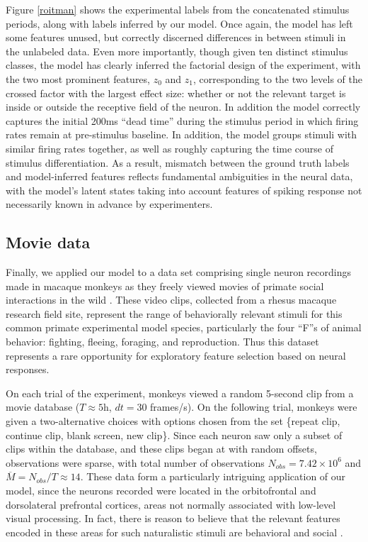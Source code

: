 \documentclass{article} %
\begin{document}
Figure \ref{roitman} shows the experimental labels from the concatenated stimulus periods, along with labels inferred by our model. Once again, the model has left some features unused, but correctly discerned differences in between stimuli in the unlabeled data. Even more importantly, though given ten distinct stimulus classes, the model has clearly inferred the factorial design of the experiment, with the two most prominent features, $z_0$ and $z_1$, corresponding to the two levels of the crossed factor with the largest effect size: whether or not the relevant target is inside or outside the receptive field of the neuron. In addition the model correctly captures the initial 200ms ``dead time'' during the stimulus period in which firing rates remain at pre-stimulus baseline. In addition, the model groups stimuli with similar firing rates together, as well as roughly capturing the time course of stimulus differentiation. As a result, mismatch between the ground truth labels and model-inferred features reflects fundamental ambiguities in the neural data, with the model's latent states taking into account features of spiking response not necessarily known in advance by experimenters.

\subsection{Movie data}
Finally, we applied our model to a data set comprising single neuron recordings made in macaque monkeys as they freely viewed movies of primate social interactions in the wild %
 . These video clips, collected from a rhesus macaque research field site, represent the range of behaviorally relevant stimuli for this common primate experimental model species, particularly the four ``F''s of animal behavior: fighting, fleeing, foraging, and reproduction. Thus this dataset represents a rare opportunity for exploratory feature selection based on neural responses.

On each trial of the experiment, monkeys viewed a random 5-second clip from a movie database ($T \approx 5$h, $dt = 30$ frames/s). On the following trial, monkeys were given a two-alternative choices with options chosen from the set \{repeat clip, continue clip, blank screen, new clip\}. Since each neuron saw only a subset of clips within the database, and these clips began at with random offsets, observations were sparse, with total number of observations $N_{obs} = 7.42 \times 10^6$ and $\overline{M} = N_{obs}/T \approx 14$. These data form a particularly intriguing application of our model, since the neurons recorded were located in the orbitofrontal and dorsolateral prefrontal cortices, areas not normally associated with low-level visual processing. In fact, there is reason to believe that the relevant features encoded in these areas for such naturalistic stimuli are behavioral and social \cite{watson2012social}.
\end{document}
